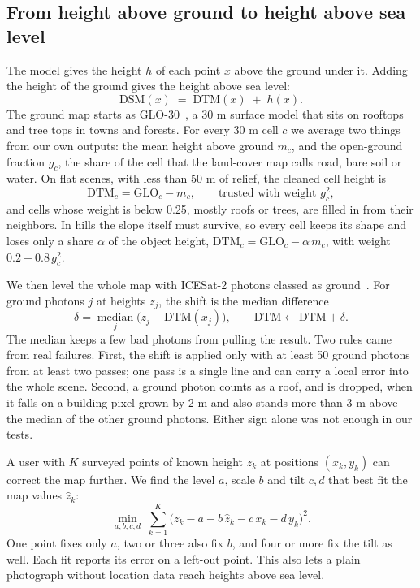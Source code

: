 \documentclass[11pt,a4paper]{article}
\newcommand{\m}{\ifmmode\,\mathrm{m}\else\,m\fi}
\begin{document}
\subsection{From height above ground to height above sea level}
The model gives the height $h$ of each point $x$ above the ground under it. Adding the height of the ground gives the height above sea level:
\begin{equation}
\mathrm{DSM}(x) \;=\; \mathrm{DTM}(x) \;+\; h(x).
\label{eq:dsm}
\end{equation}
The ground map starts as GLO-30~\cite{esa2021glo30}, a 30\m{} surface model that sits on rooftops and tree tops in towns and forests. For every 30\m{} cell $c$ we average two things from our own outputs: the mean height above ground $m_c$, and the open-ground fraction $g_c$, the share of the cell that the land-cover map calls road, bare soil or water. On flat scenes, with less than 50\m{} of relief, the cleaned cell height is
\begin{equation}
\mathrm{DTM}_c = \mathrm{GLO}_c - m_c, \qquad \text{trusted with weight } g_c^2 ,
\label{eq:clean}
\end{equation}
and cells whose weight is below 0.25, mostly roofs or trees, are filled in from their neighbors. In hills the slope itself must survive, so every cell keeps its shape and loses only a share $\alpha$ of the object height, $\mathrm{DTM}_c = \mathrm{GLO}_c - \alpha\, m_c$, with weight $0.2 + 0.8\,g_c^2$.

We then level the whole map with ICESat-2 photons classed as ground~\cite{neuenschwander2019atl08}. For ground photons $j$ at heights $z_j$, the shift is the median difference
\begin{equation}
\delta = \operatorname*{median}_j \bigl( z_j - \mathrm{DTM}(x_j) \bigr), \qquad \mathrm{DTM} \leftarrow \mathrm{DTM} + \delta .
\label{eq:level}
\end{equation}
The median keeps a few bad photons from pulling the result. Two rules came from real failures. First, the shift is applied only with at least 50 ground photons from at least two passes; one pass is a single line and can carry a local error into the whole scene. Second, a ground photon counts as a roof, and is dropped, when it falls on a building pixel grown by 2\m{} and also stands more than 3\m{} above the median of the other ground photons. Either sign alone was not enough in our tests.

A user with $K$ surveyed points of known height $z_k$ at positions $(x_k,y_k)$ can correct the map further. We find the level $a$, scale $b$ and tilt $c,d$ that best fit the map values $\hat z_k$:
\begin{equation}
\min_{a,b,c,d}\; \sum_{k=1}^{K} \bigl(z_k - a - b\,\hat z_k - c\,x_k - d\,y_k\bigr)^2 .
\label{eq:gcp}
\end{equation}
One point fixes only $a$, two or three also fix $b$, and four or more fix the tilt as well. Each fit reports its error on a left-out point. This also lets a plain photograph without location data reach heights above sea level.
\end{document}

